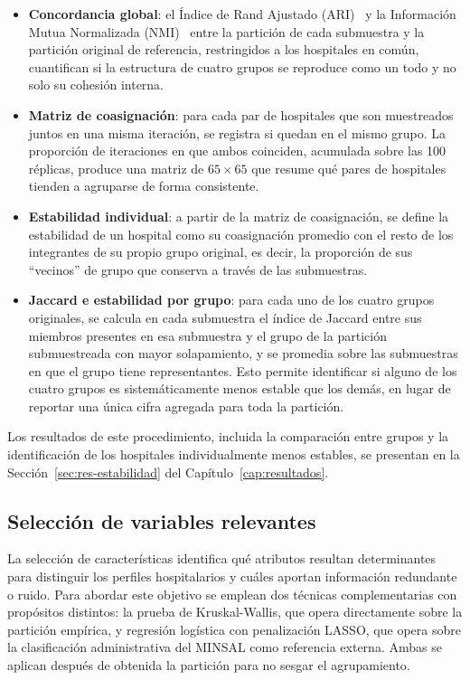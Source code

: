 \begin{itemize}
  \item \textbf{Concordancia global}: el Índice de Rand Ajustado (ARI)~\citep{HubertArabie1985} y la
    Información Mutua Normalizada (NMI)~\citep{Vinh2010} entre la partición de cada submuestra
    y la partición original de referencia, restringidos a los hospitales en
    común, cuantifican si la estructura de cuatro grupos se reproduce como un
    todo y no solo su cohesión interna.
  \item \textbf{Matriz de coasignación}: para cada par de hospitales que son
    muestreados juntos en una misma iteración, se registra si quedan en el
    mismo grupo. La proporción de iteraciones en que ambos coinciden,
    acumulada sobre las 100 réplicas, produce una matriz de $65 \times 65$
    que resume qué pares de hospitales tienden a agruparse de forma
    consistente.
  \item \textbf{Estabilidad individual}: a partir de la matriz de
    coasignación, se define la estabilidad de un hospital como su
    coasignación promedio con el resto de los integrantes de su propio
    grupo original, es decir, la proporción de sus ``vecinos'' de grupo que
    conserva a través de las submuestras.
  \item \textbf{Jaccard e estabilidad por grupo}: para cada uno de los cuatro
    grupos originales, se calcula en cada submuestra el índice de Jaccard
    entre sus miembros presentes en esa submuestra y el grupo de la
    partición submuestreada con mayor solapamiento, y se promedia sobre las
    submuestras en que el grupo tiene representantes. Esto permite
    identificar si alguno de los cuatro grupos es sistemáticamente menos
    estable que los demás, en lugar de reportar una única cifra agregada para
    toda la partición.
\end{itemize}

Los resultados de este procedimiento, incluida la comparación entre grupos y
la identificación de los hospitales individualmente menos estables, se
presentan en la Sección~\ref{sec:res-estabilidad} del Capítulo~\ref{cap:resultados}.

\subsection{Selección de variables relevantes}
\label{sec:seleccion-variables}

La selección de características identifica qué atributos resultan determinantes
para distinguir los perfiles hospitalarios y cuáles aportan información redundante
o ruido. Para abordar este objetivo se emplean dos técnicas complementarias con
propósitos distintos: la prueba de Kruskal-Wallis, que opera directamente sobre
la partición empírica, y regresión logística con penalización LASSO, que opera
sobre la clasificación administrativa del MINSAL como referencia externa. Ambas
se aplican después de obtenida la partición para no sesgar el agrupamiento.

